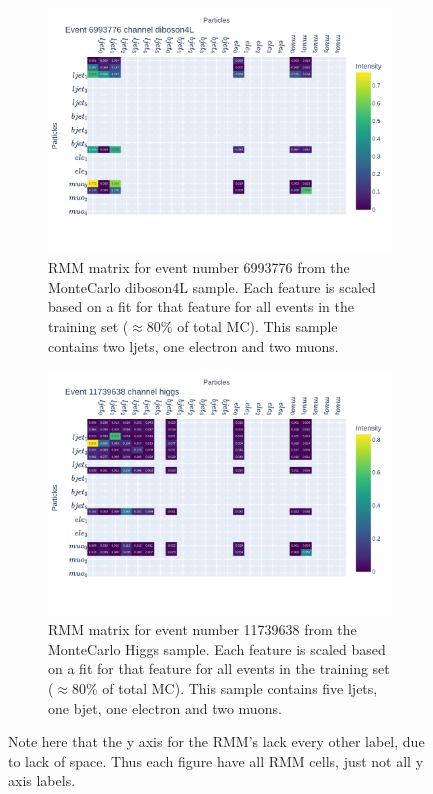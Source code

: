 \begin{figure}[h!]
    \centering
    \begin{subfigure}{.8\textwidth}
        \includegraphics[width=\textwidth]{Figures/rmms/rmm_event_6993776_diboson4L.pdf}
        \caption{RMM matrix for event number 6993776 from the MonteCarlo diboson4L sample. Each feature is scaled based on a fit for that feature for 
        all events in the training set ($\approx 80\%$ of total MC). This sample contains two ljets, one electron and two muons.}
        \label{fig:rmm_zee_event}
    \end{subfigure}
    \hfill
    \begin{subfigure}{.8\textwidth}
        \includegraphics[width=\textwidth]{Figures/rmms/rmm_event_11739638_higgs.pdf}
        \caption{ RMM matrix for event number 11739638 from the MonteCarlo Higgs sample. Each feature is scaled based on a fit for that feature for 
        all events in the training set ($\approx 80\%$ of total MC). This sample contains five ljets, one bjet, one electron and two muons. }
        \label{fig:rmm_higgs_event}
    \end{subfigure}
    \hfill        
    \caption{Note here that the y axis for the RMM's lack every other label, due to lack of space. Thus each figure have all RMM cells, 
    just not all y axis labels.  }
    \label{fig:rmm_singular_events}
\end{figure}

